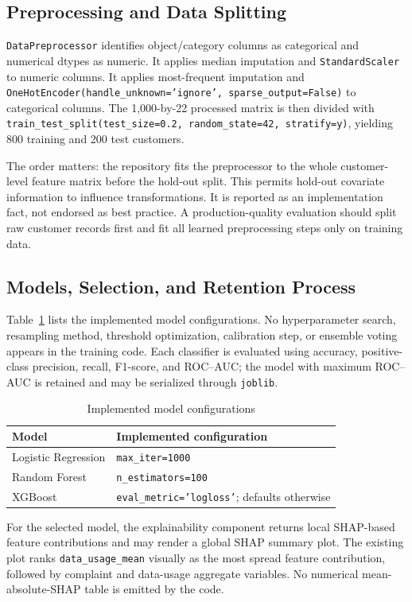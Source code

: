 \documentclass[conference]{IEEEtran}
\begin{document}
\subsection{Preprocessing and Data Splitting}
\texttt{DataPreprocessor} identifies object/category columns as categorical and numerical dtypes as numeric. It applies median imputation and \texttt{StandardScaler} to numeric columns. It applies most-frequent imputation and \texttt{OneHotEncoder(handle\_unknown='ignore', sparse\_output=False)} to categorical columns. The 1,000-by-22 processed matrix is then divided with \texttt{train\_test\_split(test\_size=0.2, random\_state=42, stratify=y)}, yielding 800 training and 200 test customers.

The order matters: the repository fits the preprocessor to the whole customer-level feature matrix before the hold-out split. This permits hold-out covariate information to influence transformations. It is reported as an implementation fact, not endorsed as best practice. A production-quality evaluation should split raw customer records first and fit all learned preprocessing steps only on training data.

\subsection{Models, Selection, and Retention Process}
Table~\ref{tab:models} lists the implemented model configurations. No hyperparameter search, resampling method, threshold optimization, calibration step, or ensemble voting appears in the training code. Each classifier is evaluated using accuracy, positive-class precision, recall, F1-score, and ROC--AUC; the model with maximum ROC--AUC is retained and may be serialized through \texttt{joblib}.

\begin{table}[!t]
\caption{Implemented model configurations}
\label{tab:models}
\centering
\begin{tabular}{ll}
\toprule
Model & Implemented configuration \\
\midrule
Logistic Regression & \texttt{max\_iter=1000} \\
Random Forest & \texttt{n\_estimators=100} \\
XGBoost & \texttt{eval\_metric='logloss'}; defaults otherwise \\
\bottomrule
\end{tabular}
\end{table}

For the selected model, the explainability component returns local SHAP-based feature contributions and may render a global SHAP summary plot. The existing plot ranks \texttt{data\_usage\_mean} visually as the most spread feature contribution, followed by complaint and data-usage aggregate variables. No numerical mean-absolute-SHAP table is emitted by the code.
\end{document}
